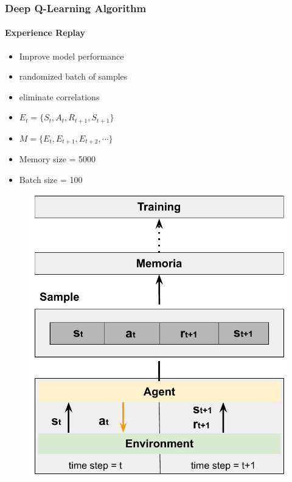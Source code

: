 \documentclass[aspectratio=169]{beamer}
\begin{document}
\begin{frame}
\frametitle{Deep Q-Learning Algorithm}
\framesubtitle{Experience Replay}
\begin{minipage}{0.4\textwidth}
    \begin{itemize}
        \item Improve model performance 
        \item randomized batch of samples
        \item eliminate correlations
        \item $E_t = \{S_{t}, A_{t}, R_{t+1}, S_{t+1}\}$
        \item $M = \{E_{t}, E_{t+1}, E_{t+2}, \cdots\}$
        \item Memory size = 5000
        \item Batch size = 100
    \end{itemize}


\end{minipage}%
\hfill
\begin{minipage}{0.4\textwidth}
\begin{figure}
    \centering
    \includegraphics[width=1\linewidth]{images/Data_collection.pdf}
\end{figure}
\end{minipage}
\end{frame}
\end{document}
